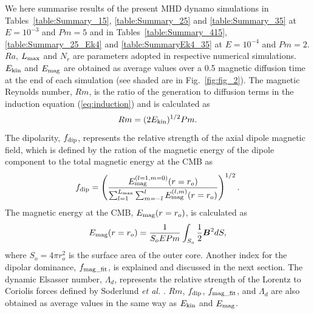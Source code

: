 {\color{red}
We here summarise results of the present MHD dynamo simulations in Tables~\ref{table:Summary_15}, \ref{table:Summary_25} and \ref{table:Summary_35} at $E = 10^{-3}$ and $Pm = 5$ and in  Tables~\ref{table:Summary_415}, \ref{table:Summary_25_Ek4} and \ref{table:SummaryEk4_35} at $E = 10^{-4}$ and $Pm = 2$.
}
{\color{red}
$Ra$, $L_{\rm max}$ and $N_r$ are parameters adopted in respective numerical simulations.
$E_{\rm kin}$ and $E_{\rm mag}$ are obtained as average values over a 0.5 magnetic diffusion time at the end of each simulation (see shaded are in Fig.~\ref{fig:fig_2}).
}
{\color{red}
The magnetic Reynolds number, $Rm$, is the ratio of the generation to diffusion terms in the induction equation (\ref{eq:induction}) and is calculated as
%
\begin{equation}
Rm = (2 E_{\rm kin})^{1/2} Pm .
\label{eq:Rm}
\end{equation}
%
The dipolarity, $f_{\rm dip}$, represents the relative strength of the axial dipole magnetic field, which is defined by the ration of the magnetic energy of the dipole component to the total magnetic energy at the CMB as
%
%
\begin{equation}
f_{\rm dip} = 
\left(
\frac{E_{\rm mag}^{(l=1,m=0)} (r=r_o)}
     {\sum_{l=1}^{L_{\rm max}}
      \sum_{m=-l}^l E_{\rm mag}^{(l,m)} (r=r_o)}
\right)^{1/2}.
\label{eq:f_dip}
\end{equation}
%
The magnetic energy at the CMB, $E_{\rm mag} (r=r_o)$, is calculated as
%
\begin{equation}
E_{\rm mag} (r=r_o) = 
  \frac{1}{S_o E Pm} \int_{S_o} \frac{1}{2} \mbox{\boldmath$B$}^2 dS,
\end{equation}
%
where $S_o = 4\pi r_o^2$ is the surface area of the outer core.
Another index for the dipolar dominance, $f_{\rm mag\_fit}$, is explained and discussed in the next section.
The dynamic Elsasser number, $\Lambda_d$, represents the relative strength of the Lorentz to Coriolis forces defined by Soderlund {\it et al.} .
$Rm$, $f_{\rm dip}$, $f_{\rm mag\_fit}$, and $\Lambda_d$ are also obtained as average values in the same way as $E_{\rm kin}$ and $E_{\rm mag}$.
}

